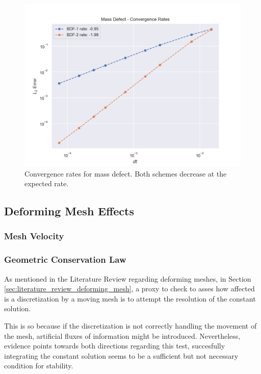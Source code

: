 \documentclass[../../thesis.tex]{subfiles}
\begin{document}
\begin{figure}[h]
    \centering
    \includegraphics[width=1\columnwidth]{research_project/piston/figures/bdf_convergence/convergence_rates_mass.png}
    \caption{Convergence rates for mass defect.
    Both schemes decrease at the expected rate.}
    \label{fig:bdf_convergence_mass}
\end{figure}

\subsection{Deforming Mesh Effects}

\subsubsection{Mesh Velocity}


\subsubsection{Geometric Conservation Law}
As mentioned in the Literature Review regarding deforming meshes, 
in Section \ref{sec:literature_review_deforming_mesh},
a proxy to check to asses how affected is a discretization by a moving mesh
is to attempt the resolution of the constant solution.

This is so because if the discretization is not correctly handling the movement of the mesh,
artificial fluxes of information might be introduced. 
Nevertheless, evidence points towards both directions regarding this test,
succesfully integrating the constant solution seems to be a sufficient but not necessary condition for stability.
\end{document}
